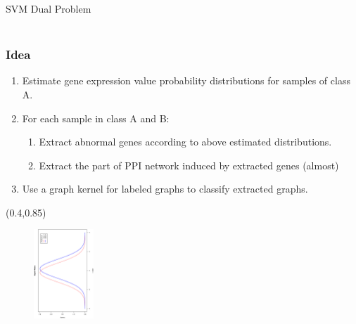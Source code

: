 \documentclass{beamer}
\begin{document}
\begin{frame}
{\begin{block}{\tiny{SVM Dual Problem}}
\begin{center}
\begin{align*}
          \end{align*}
        \end{center}
      \end{block}
}
\end{frame}

\begin{frame}
  \frametitle{Idea}
  \begin{enumerate}
\footnotesize
  \item Estimate gene expression value probability distributions for samples of class A. 
  \item For each sample in class A and B:
    \begin{enumerate}
\scriptsize
    \item Extract abnormal genes according to above estimated distributions.
    \item Extract the part of PPI network induced by extracted genes (almost)
    \end{enumerate}
  \item Use a graph kernel for labeled graphs to classify extracted graphs.
  \end{enumerate}
  \begin{textblock*}{\paperwidth}(0.4\textwidth,0.85\textheight)
    \raggedright
  \begin{figure}
    \includegraphics[angle=270,width=0.2\textwidth]{signal-nodes}
  \end{figure}
  \end{textblock*}
\end{frame}
\end{document}
